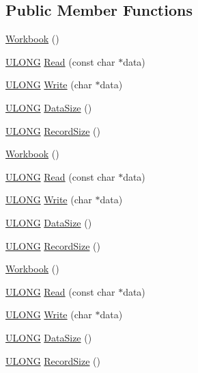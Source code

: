 \subsection*{Public Member Functions}
\begin{DoxyCompactItemize}
\item 
\hyperlink{class_y_excel_1_1_workbook_aea85d73eb37cc62ddaab0ffec439f952}{Workbook} ()
\item 
\hyperlink{_basic_excel_8hpp_abe09d1bea023be6a07cbadde8e955435}{U\+L\+O\+N\+G} \hyperlink{class_y_excel_1_1_workbook_a4d8fd585f8dfa2443e7647f6e7fd060f}{Read} (const char $\ast$data)
\item 
\hyperlink{_basic_excel_8hpp_abe09d1bea023be6a07cbadde8e955435}{U\+L\+O\+N\+G} \hyperlink{class_y_excel_1_1_workbook_a6256e8826d8944125dab139a6bccfa1d}{Write} (char $\ast$data)
\item 
\hyperlink{_basic_excel_8hpp_abe09d1bea023be6a07cbadde8e955435}{U\+L\+O\+N\+G} \hyperlink{class_y_excel_1_1_workbook_a48d1111f05f1602d86f84a5dc31af62e}{Data\+Size} ()
\item 
\hyperlink{_basic_excel_8hpp_abe09d1bea023be6a07cbadde8e955435}{U\+L\+O\+N\+G} \hyperlink{class_y_excel_1_1_workbook_a403964c39bac03c78ae92bb07a19c9de}{Record\+Size} ()
\item 
\hyperlink{class_y_excel_1_1_workbook_aea85d73eb37cc62ddaab0ffec439f952}{Workbook} ()
\item 
\hyperlink{_basic_excel_8hpp_abe09d1bea023be6a07cbadde8e955435}{U\+L\+O\+N\+G} \hyperlink{class_y_excel_1_1_workbook_a4d8fd585f8dfa2443e7647f6e7fd060f}{Read} (const char $\ast$data)
\item 
\hyperlink{_basic_excel_8hpp_abe09d1bea023be6a07cbadde8e955435}{U\+L\+O\+N\+G} \hyperlink{class_y_excel_1_1_workbook_a6256e8826d8944125dab139a6bccfa1d}{Write} (char $\ast$data)
\item 
\hyperlink{_basic_excel_8hpp_abe09d1bea023be6a07cbadde8e955435}{U\+L\+O\+N\+G} \hyperlink{class_y_excel_1_1_workbook_a48d1111f05f1602d86f84a5dc31af62e}{Data\+Size} ()
\item 
\hyperlink{_basic_excel_8hpp_abe09d1bea023be6a07cbadde8e955435}{U\+L\+O\+N\+G} \hyperlink{class_y_excel_1_1_workbook_a403964c39bac03c78ae92bb07a19c9de}{Record\+Size} ()
\item 
\hyperlink{class_y_excel_1_1_workbook_aea85d73eb37cc62ddaab0ffec439f952}{Workbook} ()
\item 
\hyperlink{_basic_excel_8hpp_abe09d1bea023be6a07cbadde8e955435}{U\+L\+O\+N\+G} \hyperlink{class_y_excel_1_1_workbook_a4d8fd585f8dfa2443e7647f6e7fd060f}{Read} (const char $\ast$data)
\item 
\hyperlink{_basic_excel_8hpp_abe09d1bea023be6a07cbadde8e955435}{U\+L\+O\+N\+G} \hyperlink{class_y_excel_1_1_workbook_a6256e8826d8944125dab139a6bccfa1d}{Write} (char $\ast$data)
\item 
\hyperlink{_basic_excel_8hpp_abe09d1bea023be6a07cbadde8e955435}{U\+L\+O\+N\+G} \hyperlink{class_y_excel_1_1_workbook_a48d1111f05f1602d86f84a5dc31af62e}{Data\+Size} ()
\item 
\hyperlink{_basic_excel_8hpp_abe09d1bea023be6a07cbadde8e955435}{U\+L\+O\+N\+G} \hyperlink{class_y_excel_1_1_workbook_a403964c39bac03c78ae92bb07a19c9de}{Record\+Size} ()
\end{DoxyCompactItemize}
